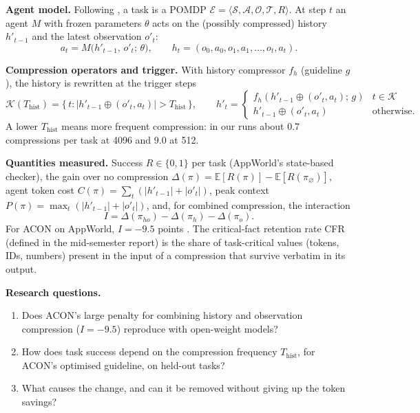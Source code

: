 \documentclass[10pt,a4paper]{article}
\begin{document}
\textbf{Agent model.} Following \cite{ACON}, a task is a POMDP
$\mathcal{E}=\langle\mathcal{S},\mathcal{A},\mathcal{O},\mathcal{T},R\rangle$.
At step $t$ an agent $M$ with frozen parameters $\theta$ acts on the (possibly
compressed) history $h'_{t-1}$ and the latest observation $o'_t$:
\begin{equation}
a_t = M\big(h'_{t-1},\,o'_t;\,\theta\big),\qquad
h_t=(o_0,a_0,o_1,a_1,\dots,o_t,a_t).
\label{eq:agent}
\end{equation}

\textbf{Compression operators and trigger.} With history compressor $f_h$
(guideline $g$), the history is rewritten at the trigger steps
\begin{equation}
\mathcal{K}(T_{\mathrm{hist}})=\big\{\,t : |h'_{t-1}\oplus(o'_t,a_t)|>T_{\mathrm{hist}}\,\big\},
\qquad
h'_t=\begin{cases} f_h(h'_{t-1}\oplus(o'_t,a_t);\,g) & t\in\mathcal{K}\\ h'_{t-1}\oplus(o'_t,a_t) & \text{otherwise}.\end{cases}
\label{eq:trigger}
\end{equation}
A lower $T_{\mathrm{hist}}$ means more frequent compression: in our runs about
0.7 compressions per task at 4096 and 9.0 at 512.

\textbf{Quantities measured.} Success $R\in\{0,1\}$ per task (AppWorld's
state-based checker), the gain over no compression
$\Delta(\pi)=\mathbb{E}[R(\pi)]-\mathbb{E}[R(\pi_\varnothing)]$, agent token cost
$C(\pi)=\sum_t(|h'_{t-1}|+|o'_t|)$, peak context
$P(\pi)=\max_t(|h'_{t-1}|+|o'_t|)$, and, for combined compression, the interaction
\begin{equation}
I=\Delta(\pi_{ho})-\Delta(\pi_h)-\Delta(\pi_o).
\label{eq:interaction}
\end{equation}
For ACON on AppWorld, $I=-9.5$ points \cite{ACON}. The critical-fact retention
rate CFR (defined in the mid-semester report) is the share of task-critical
values (tokens, IDs, numbers) present in the input of a compression that
survive verbatim in its output.

\textbf{Research questions.}
\begin{enumerate}[label=\textbf{RQ\arabic*.}]
\item Does ACON's large penalty for combining history and observation
compression ($I=-9.5$) reproduce with open-weight models?
\item How does task success depend on the compression frequency
$T_{\mathrm{hist}}$, for ACON's optimised guideline, on held-out tasks?
\item What causes the change, and can it be removed without giving up the
token savings?
\end{enumerate}
\end{document}
